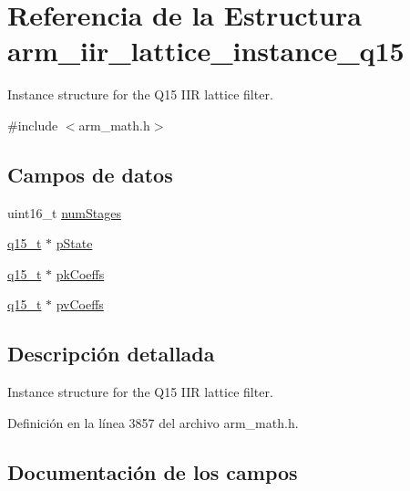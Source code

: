 \hypertarget{structarm__iir__lattice__instance__q15}{}\section{Referencia de la Estructura arm\+\_\+iir\+\_\+lattice\+\_\+instance\+\_\+q15}
\label{structarm__iir__lattice__instance__q15}


Instance structure for the Q15 I\+IR lattice filter.  




{\ttfamily \#include $<$arm\+\_\+math.\+h$>$}

\subsection*{Campos de datos}
\begin{DoxyCompactItemize}
\item 
uint16\+\_\+t \hyperlink{structarm__iir__lattice__instance__q15_a4cceb90547b3e585d4c7aabaa8057212}{num\+Stages}
\item 
\hyperlink{arm__math_8h_ab5a8fb21a5b3b983d5f54f31614052ea}{q15\+\_\+t} $\ast$ \hyperlink{structarm__iir__lattice__instance__q15_ae29dfdb736374fcddaeaec4b7770170c}{p\+State}
\item 
\hyperlink{arm__math_8h_ab5a8fb21a5b3b983d5f54f31614052ea}{q15\+\_\+t} $\ast$ \hyperlink{structarm__iir__lattice__instance__q15_a12497c299b0341c18d497f8ab3465084}{pk\+Coeffs}
\item 
\hyperlink{arm__math_8h_ab5a8fb21a5b3b983d5f54f31614052ea}{q15\+\_\+t} $\ast$ \hyperlink{structarm__iir__lattice__instance__q15_a52866ed127c7b2a8a102e2ed1a2ebab8}{pv\+Coeffs}
\end{DoxyCompactItemize}


\subsection{Descripción detallada}
Instance structure for the Q15 I\+IR lattice filter. 

Definición en la línea 3857 del archivo arm\+\_\+math.\+h.



\subsection{Documentación de los campos}
